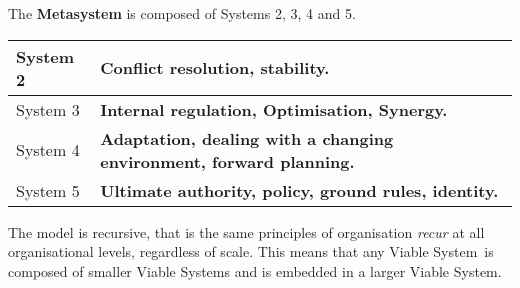 The \textcolor{M}{\textbf{Metasystem}} is composed of Systems 2, 3, 4 and 5.

\begin{table}[H]
\centering
\begin{tabular}{|C{0.13\textwidth} | L{0.8\textwidth}|}
    \hline
    System 2 & \textbf{Conflict resolution, stability}. \\
    \hline
    System 3 & \textbf{Internal regulation, Optimisation, Synergy.} \\
    \hline
    System 4 & \textbf{Adaptation, dealing with a changing environment, forward planning.} \\
    \hline
    System 5 & \textbf{Ultimate authority, policy, ground rules, identity.}  \\
    \hline
\end{tabular}
\end{table}

The model is recursive, that is the same principles of organisation \textit{recur} at all organisational levels, regardless of scale. This means that any Viable System is composed of smaller Viable Systems and is embedded in a larger Viable System.
